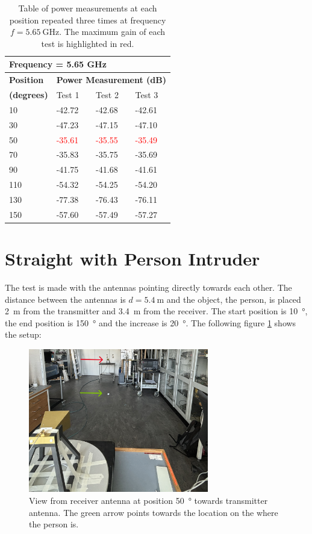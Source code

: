 \begin{table}[H]
    \centering
    \begin{tabular}{l|l|l|l}
        \multicolumn{4}{l}{\textbf{Frequency = 5.65 GHz}}         \\
        \hline
        \textbf{Position} & \multicolumn{3}{l}{\textbf{Power Measurement (dB)}} \\
        \textbf{(degrees)}  & Test 1    & Test 2  & Test 3  \\
        \hline
        \hline
        10      & -42.72    & -42.68    & -42.61 \\
        30      & -47.23    & -47.15    & -47.10 \\
        50      & \textcolor{red}{-35.61}    & \textcolor{red}{-35.55}    & \textcolor{red}{-35.49} \\
        70      & -35.83    & -35.75    & -35.69 \\
        90      & -41.75    & -41.68    & -41.61 \\
        110     & -54.32    & -54.25    & -54.20 \\
        130     & -77.38    & -76.43    & -76.11 \\
        150     & -57.60    & -57.49    & -57.27
        \end{tabular}
    \caption{Table of power measurements at each position repeated three times at frequency $f=\SI{5.65}{\giga\hertz}$. The maximum gain of each test is highlighted in red.}
    \label{tab:a2_4b}
\end{table}

\section{Straight with Person Intruder}
The test is made with the antennas pointing directly towards each other. The distance between the antennas is $d=\SI{5.4}{\meter}$ and the object, the person, is placed \SI{2}{\meter} from the transmitter and \SI{3.4}{\meter} from the receiver. The start position is \SI{10}{\degree}, the end position is \SI{150}{\degree} and the increase is \SI{20}{\degree}. The following figure \ref{fig:a2_5} shows the setup:
\begin{figure}[H]
    \centering
    \includegraphics[width=0.7\textwidth]{figures/test_intruder_person.JPG}
    \caption{View from receiver antenna at position \SI{50}{\degree} towards transmitter antenna. The green arrow points towards the location on the where the person is.} \label{fig:a2_5}
\end{figure}

